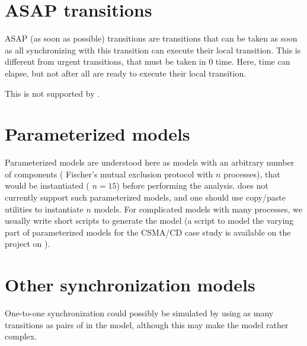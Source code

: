 


\section{ASAP transitions}

ASAP (as soon as possible) transitions are transitions that can be taken as soon as all \IPTA{} synchronizing with this transition can execute their local transition.
This is different from urgent transitions, that must be taken in 0 time.
Here, time can elapse, but not after all \IPTA{} are ready to execute their local transition.

This is not supported by \imitator{}. %



\section{Parameterized models}

Parameterized models are understood here as models with an arbitrary number of components (\eg{} Fischer's mutual exclusion protocol with $n$ processes), that would be instantiated (\eg{} $n = 15$) before performing the analysis.
\imitator{} does not currently support such parameterized models, and one should use copy/paste utilities to instantiate $n$ models.
For complicated models with many processes, we usually write short scripts to generate the model (a script  to model the varying part of parameterized models for the CSMA/CD case study is available on the \imitator{} project on \GitHubIMI{}).




\section{Other synchronization models}

One-to-one synchronization could possibly be simulated by using as many transitions as pairs of \IPTA{} in the model, although this may make the model rather complex.

